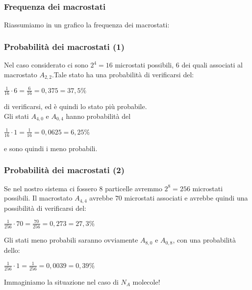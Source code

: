 \documentclass[]{beamer}
\theoremstyle{plain}
\begin{document}
\begin{frame}
  \frametitle{Frequenza dei macrostati}
  Riassumiamo in un grafico la frequenza dei macrostati:
  \begin{figure}
  \end{figure}
\end{frame}

\begin{frame}
  \frametitle{Probabilità dei macrostati (1)}
   Nel caso considerato ci sono $ 2^4 = 16 $ microstati possibili, $ 6 $ dei quali associati al macrostato $ A_{2,2} $.\pause Tale stato ha una probabilità di verificarsi del:
   \begin{center}
   $ \frac{1}{16} \cdot 6 = \frac{6}{16} = 0,375 = 37,5 \% $ 
   \end{center}
   di verificarsi, ed è quindi lo stato più probabile.\pause\\
   Gli stati $ A_{4,0} $ e $ A_{0,4} $ hanno probabilità del 
   \begin{center}
   $ \frac{1}{16} \cdot 1 = \frac{1}{16} = 0,0625 = 6,25 \% $ 
   \end{center}
  e sono quindi i meno probabili.
\end{frame}


\begin{frame}
  \frametitle{Probabilità dei macrostati (2)}
Se nel nostro sistema ci fossero $ 8 $ particelle avremmo $ 2^8 = 256 $ microstati possibili.{\pause} Il macrostato $ A_{4,4} $ avrebbe $ 70 $ microstati associati e avrebbe quindi una possibilità di verificarsi del:
      \begin{center}
   $ \frac{1}{256} \cdot 70 = \frac{70}{256} = 0,273 = 27,3 \% $ 
   \end{center}{\pause}
Gli stati meno probabili saranno ovviamente $ A_{8,0} $ e $ A_{0,8} $, con una probabilità dello:
      \begin{center}
   $ \frac{1}{256} \cdot 1 = \frac{1}{256} = 0,0039 = 0,39 \% $ 
   \end{center}\pause
   Immaginiamo la situazione nel caso di $ N_A $ molecole!
\end{frame}
\end{document}
